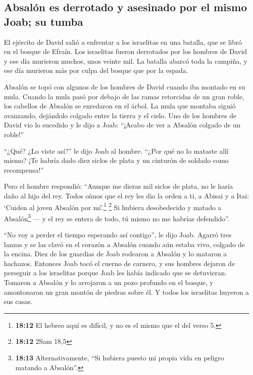 \hypertarget{absaluxf3n-es-derrotado-y-asesinado-por-el-mismo-joab-su-tumba}{%
\subsection{Absalón es derrotado y asesinado por el mismo Joab; su
tumba}\label{absaluxf3n-es-derrotado-y-asesinado-por-el-mismo-joab-su-tumba}}

 El ejército de David salió a enfrentar a los israelitas
en una batalla, que se libró en el bosque de Efraín.  Los
israelitas fueron derrotados por los hombres de David y ese día murieron
muchos, unos veinte mil.  La batalla abarcó toda la
campiña, y ese día murieron más por culpa del bosque que por la espada.

 Absalón se topó con algunos de los hombres de David
cuando iba montado en su mula. Cuando la mula pasó por debajo de las
ramas retorcidas de un gran roble, los cabellos de Absalón se enredaron
en el árbol. La mula que montaba siguió avanzando, dejándolo colgado
entre la tierra y el cielo.  Uno de los hombres de David
vio lo sucedido y le dijo a Joab: ``¡Acabo de ver a Absalón colgado de
un roble!''

 ``¿Qué? ¿Lo viste así?'' le dijo Joab al hombre. ``¿Por
qué no lo mataste allí mismo? ¡Te habría dado diez siclos de plata y un
cinturón de soldado como recompensa!''

 Pero el hombre respondió: ``Aunque me dieras mil siclos
de plata, no le haría daño al hijo del rey. Todos oímos que el rey les
dio la orden a ti, a Abisai y a Itai: `Cuiden al joven Absalón por
mí'.\footnote{\textbf{18:12} El hebreo aquí es difícil, y no es el mismo
  que el del verso 5.} \footnote{\textbf{18:12} 2Sam 18,5}
 Si hubiera desobedecido y matado a Absalón\footnote{\textbf{18:13}
  Alternativamente, ``Si hubiera puesto mi propia vida en peligro
  matando a Absalón''.} --- y el rey se entera de todo, tú mismo no me
habrías defendido''.

 ``No voy a perder el tiempo esperando así contigo'', le
dijo Joab. Agarró tres lanzas y se las clavó en el corazón a Absalón
cuando aún estaba vivo, colgado de la encina.  Diez de
los guardias de Joab rodearon a Absalón y lo mataron a hachazos.
 Entonces Joab tocó el cuerno de carnero, y sus hombres
dejaron de perseguir a los israelitas porque Joab les había indicado que
se detuvieran.  Tomaron a Absalón y lo arrojaron a un
pozo profundo en el bosque, y amontonaron un gran montón de piedras
sobre él. Y todos los israelitas huyeron a sus casas.

